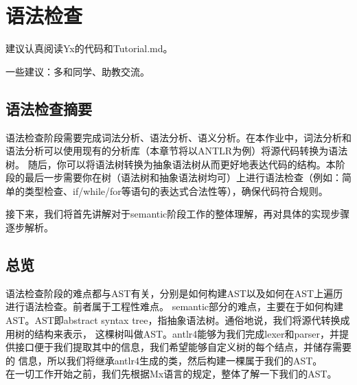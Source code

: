 

\chapter{语法检查}

\begin{introduction}
    \item 建议认真阅读Yx的代码和Tutorial.md。
    \item 一些建议：多和同学、助教交流。
\end{introduction}


\section{语法检查摘要}
语法检查阶段需要完成词法分析、语法分析、语义分析。在本作业中，词法分析和语法分析可以使用现有的分析库（本章节将以ANTLR为例）将源代码转换为语法树。
随后，你可以将语法树转换为抽象语法树从而更好地表达代码的结构。本阶段的最后一步需要你在树（语法树和抽象语法树均可）上进行语法检查（例如：简单的类型检查、if/while/for等语句的表达式合法性等），确保代码符合规则。

接下来，我们将首先讲解对于semantic阶段工作的整体理解，再对具体的实现步骤逐步解析。

\section{总览}
语法检查阶段的难点都与AST有关，分别是如何构建AST以及如何在AST上遍历进行语法检查。前者属于工程性难点。
semantic部分的难点，主要在于如何构建AST。AST即abstract syntax tree，指抽象语法树。通俗地说，我们将源代转换成用树的结构来表示，
这棵树叫做AST。antlr4能够为我们完成lexer和parser，并提供接口便于我们提取其中的信息，我们希望能够自定义树的每个结点，并储存需要的
信息，所以我们将继承antlr4生成的类，然后构建一棵属于我们的AST。\\

在一切工作开始之前，我们先根据Mx语言的规定，整体了解一下我们的AST。 \\

